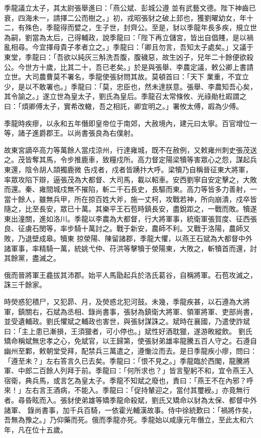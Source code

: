 \begin{pinyinscope}
 季龍議立太子，其太尉張舉進曰：「燕公斌、彭城公遵
 並有武藝文德。陛下神齒已衰，四海未一，請擇二公而樹之。」初，戎昭張豺之破上邽也，獲劉曜幼女，年十二，有殊色，季龍得而嬖之，生子世，封齊公。至是，豺以季龍年長多疾，規立世為嗣，劉當為太后，己得輔政，說季龍曰：「陛下再立儲宮，皆出自倡賤，是以禍亂相尋。今宜擇母貴子孝者立之。」季龍曰：「卿且勿言，吾知太子處矣。」又議于東堂，季龍曰：「吾欲以純灰三斛洗吾腹，腹穢惡，故生凶子，兒年二十餘便欲殺公。今世方十歲，比其二十，吾已老矣。」於是與張舉、李農定議，敕公卿上書請立世。大司農曹莫不署名，季龍使張豺問其故。莫頓首曰：「天下
 業重，不宜立少，是以不敢署也。」季龍曰：「莫，忠臣也，然未達朕意。張舉、李農知吾心矣，其令諭之。」遂立世為皇太子，劉氏為皇后。季龍召太常條攸、光祿勛杜嘏謂之曰：「煩卿傅太子，實希改轍，吾之相託，卿宜明之。」署攸太傅，嘏為少傅。



 季龍時疾瘳，以永和五年僭即皇帝位于南郊，大赦境內，建元曰太寧。百官增位一等，諸子進爵郡王。以尚書張良為右僕射。



 故東宮謫卒高力等萬餘人當戍涼州，行達雍城，既不在赦例，又敕雍州刺史張茂送之。茂皆奪其馬，令步推鹿車，致糧戍所。高力督定陽梁犢等害眾心之怨，謀起兵東還，陰令胡人頡獨鹿微
 告戍者，戍者皆踴抃大呼。梁犢乃自稱晉征東大將軍，率眾攻陷下辯，逼張茂為大都督、大司馬，載以軺車。安西劉寧自安定擊之，大敗而還。秦、雍間城戍無不摧陷，斬二千石長史，長驅而東。高力等皆多力善射，一當十餘人，雖無兵甲，所在掠百姓大斧，施一丈柯，攻戰若神，所向崩潰，戍卒皆隨之，比至長安，眾已十萬。其樂平王石苞時鎮長安，盡銳距之，一戰而敗。犢遂東出潼關，進如洛川。季龍以李農為大都督，行大將軍事，統衛軍張賀度、征西張良、征虜石閔等，率步騎十萬討之。戰于新安，農師不利。又戰于洛陽，農師又敗，乃退壁成皋。犢東
 掠滎陽、陳留諸郡，季龍大懼，以燕王石斌為大都督中外諸軍事，率精騎一萬，統姚弋仲、苻洪等擊犢于滎陽東，大敗之，斬犢首而還，討其餘黨，盡滅之。



 俄而晉將軍王龕拔其沛郡。始平人馬勖起兵於洛氏葛谷，自稱將軍。石苞攻滅之，誅三千餘家。



 時熒惑犯積尸，又犯昴、月，及熒惑北犯河鼓。未幾，季龍疾甚，以石遵為大將軍，鎮關右，石斌為丞相、錄尚書事，張豺為鎮衛大將軍、領軍將軍、吏部尚書，並受遺輔政。劉氏懼斌之輔政也害世，與張豺謀誅之。斌時在襄國，乃遣使詐斌曰：「主上患已漸損，王須獵者，可小停也。」斌性好酒耽獵，遂游畋縱飲。
 劉氏矯命稱斌無忠孝之心，免斌官，以王歸第，使張豺弟雄率龍騰五百人守之。石遵自幽州至鄴，敕朝堂受拜，配禁兵三萬遣之，遵慟泣而去。是日季龍疾小瘳，問曰：「遵至未？」左右答言久已去矣。季龍曰：「恨不見之。」季龍臨於西閣，龍騰將軍、中郎二百餘人列拜于前。季龍曰：「何所求也？」皆言聖躬不和，宜令燕王入宿衛，典兵馬，或言乞為皇太子。季龍不知斌之廢也，責曰：「燕王不在內邪？呼來！」左右言王酒病，不能入。季龍曰：「促持輦迎之，當付其璽綬。」亦竟無行者。尋昏眩而入。張豺使弟雄等矯季龍命殺斌，劉氏又矯命以豺為太保、都督中外諸軍、
 錄尚書事，加千兵百騎，一依霍光輔漢故事。侍中徐統歎曰：「禍將作矣，吾無為豫之。」乃仰藥而死。俄而季龍亦死。季龍始以咸康元年僭立，至此太和六年，凡在位十五歲。




\end{pinyinscope}
